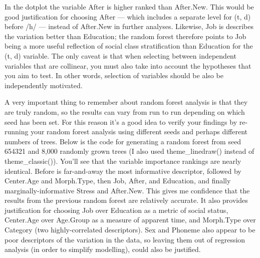 \documentclass[
  10pt,
  letterpaper]{article}
\renewcommand\texttt[1]{{\ttfamily\color{BrickRed}#1}}
\begin{document}
In the dotplot the variable \texttt{After} is higher ranked than
\texttt{After.New}. This would be good justification for choosing
\texttt{After} --- which includes a separate level for (t, d) before /h/
--- instead of \texttt{After.New} in further analyses. Likewise,
\texttt{Job} is describes the variation better than \texttt{Education};
the random forest therefore points to \texttt{Job} being a more useful
reflection of social class stratification than \texttt{Education} for
the (t, d) variable. The only caveat is that when selecting between
independent variables that are collinear, you must also take into
account the hypotheses that you aim to test. In other words, selection
of variables should be also be independently motivated.

A very important thing to remember about random forest analysis is that
they are truly random, so the results can vary from run to run depending
on which seed has been set. For this reason it's a good idea to verify
your findings by re-running your random forest analysis using different
seeds and perhaps different numbers of trees. Below is the code for
generating a random forest from seed 654321 and 8,000 randomly grown
trees (I also used \texttt{theme\_linedraw()} instead of
\texttt{theme\_classic()}). You'll see that the variable importance
rankings are nearly identical. \texttt{Before} is far-and-away the most
informative descriptor, followed by \texttt{Center.Age} and
\texttt{Morph.Type}, then \texttt{Job}, \texttt{After}, and
\texttt{Education}, and finally marginally-informative \texttt{Stress}
and \texttt{After.New}. This gives me confidence that the results from
the previous random forest are relatively accurate. It also provides
justification for choosing \texttt{Job} over \texttt{Education} as a
metric of social status, \texttt{Center.Age} over \texttt{Age.Group} as
a measure of apparent time, and \texttt{Morph.Type} over
\texttt{Category} (two highly-correlated descriptors). \texttt{Sex} and
\texttt{Phoneme} also appear to be poor descriptors of the variation in
the data, so leaving them out of regression analysis (in order to
simplify modelling), could also be justified.
\end{document}
